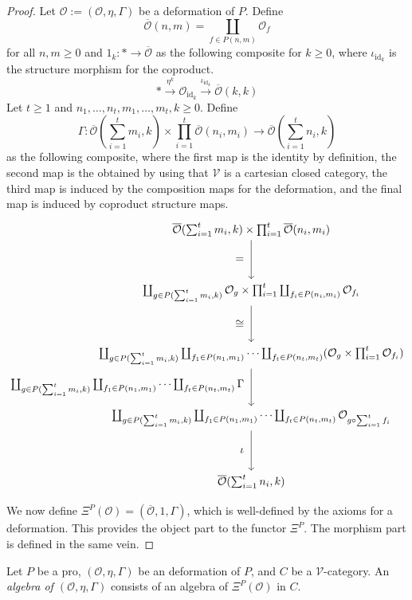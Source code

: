 \documentclass{tac}
\begin{document}
\begin{proof}
Let $\mathcal{O}:=(\mathcal{O},\eta,\Gamma)$ be a deformation of $P$. Define 
\[
\overline{\mathcal{O}}(n,m)=\coprod_{f\in P(n,m)}\mathcal{O}_f
\]
for all $n,m\geq 0$ and $1_k:*\to\overline{\mathcal{O}}$ as the following composite for $k\geq 0$, where $\iota_{\text{id}_k}$ is the structure morphism for the coproduct.
\[
*\xrightarrow{\eta^k}\mathcal{O}_{\text{id}_k}\xrightarrow{\iota_{\text{id}_k}}\overline{\mathcal{O}}(k,k)
\]
Let $t\geq 1$ and $n_1,\dots, n_t,m_1,\dots, m_t,k\geq 0$. Define 
\[
\Gamma:\overline{\mathcal{O}}(\sum_{i=1}^tm_i,k)\times \prod_{i=1}^t\overline{\mathcal{O}}(n_i,m_i)\to \overline{\mathcal{O}}(\sum_{i=1}^tn_i,k)
\]
as the following composite, where the first map is the identity  by definition, the second map is the obtained by using that $\mathcal{V}$ is a cartesian closed category, the third map is induced by the composition maps for the deformation, and the final map is induced by coproduct structure maps.
\[
\begin{tikzpicture}[node distance=2cm]
    \node (A) {$\overline{\mathcal{O}}(\sum_{i=1}^tm_i,k)\times \prod_{i=1}^t\overline{\mathcal{O}}(n_i,m_i)$};
    \node (B)[below of=A]{$\coprod_{g\in P(\sum_{i=1}^tm_i,k)}\mathcal{O}_g\times \prod_{i=1}^t\coprod_{f_i\in P(n_i,m_i)}\mathcal{O}_{f_i}$};
    \node (C) [below of=B]{$\coprod_{g\in P(\sum_{i=1}^tm_i,k)}\coprod_{f_1\in P(n_1,m_1)}\dots \coprod_{f_t\in P(n_t,m_t)}(\mathcal{O}_g\times\prod_{i=1}^t\mathcal{O}_{f_i})$};
    \node (D)[below of=C]{$\coprod_{g\in P(\sum_{i=1}^tm_i,k)}\coprod_{f_1\in P(n_1,m_1)}\dots \coprod_{f_t\in P(n_t,m_t)}\mathcal{O}_{g\circ\sum_{i=1}^tf_i}$};
    \node (E)[below of=D]{$\overline{\mathcal{O}}(\sum_{i=1}^tn_i,k)$};
    \draw[->](A) to node[left=3]{$=$}(B);
    \draw[->](B) to node[left=3]{$\cong$}(C);
    \draw[->](C) to node[left=3]{$\coprod_{g\in P(\sum_{i=1}^tm_i,k)}\coprod_{f_1\in P(n_1,m_1)}\dots \coprod_{f_t\in P(n_t,m_t)}\Gamma$}(D);
    \draw[->](D) to node[left=3]{$\iota$}(E);
\end{tikzpicture}
\]
We now define $\Xi^P(\mathcal{O})=(\overline{\mathcal{O}},1,\Gamma)$, which is well-defined by the axioms for a deformation. This provides the object part to the functor $\Xi^P$. The morphism part is defined in the same vein.
\end{proof}

\begin{definition}
    Let $P$ be a pro, $(\mathcal{O},\eta,\Gamma)$ be an deformation of $P$, and $C$ be a $\mathcal{V}$-category. An \emph{algebra of $(\mathcal{O},\eta,\Gamma)$} consists of an algebra of $\Xi^P(\mathcal{O})$ in $C$.
\end{definition}
\end{document}

